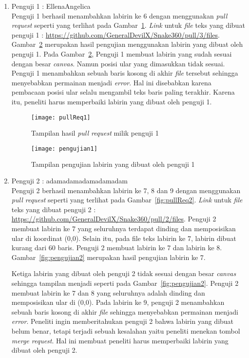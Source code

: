 \begin{enumerate}
	\item Penguji 1 : EllenaAngelica\\
	Penguji 1 berhasil menambahkan labirin ke 6 dengan menggunakan \textit{pull request} seperti yang terlihat pada Gambar~\ref{fig:pullReq1}. \textit{Link} untuk \textit{file} teks yang dibuat penguji 1 :  \url{https://github.com/GeneralDevilX/Snake360/pull/3/files}. Gambar~\ref{fig:pengujian1} merupakan hasil pengujian menggunakan labirin yang dibuat oleh penguji 1. Pada Gambar~\ref{fig:pengujian1}, Penguji 1 membuat labirin yang sudah sesuai dengan besar \textit{canvas}. Namun posisi ular yang dimasukkan tidak sesuai. Penguji 1 menambahkan sebuah baris kosong di akhir \textit{file} tersebut sehingga menyebabkan permainan menjadi \textit{error}. Hal ini disebabkan karena pembacaan posisi ular selalu mengambil teks baris paling terakhir. Karena itu, peneliti harus memperbaiki labirin yang dibuat oleh penguji 1.
	
	\begin{figure}[H]
		\centering  
		\texttt{[image: pullReq1]}  
		\caption[Tampilan hasil \textit{pull request} milik penguji 1]{Tampilan hasil \textit{pull request} milik penguji 1}
		\label{fig:pullReq1} 
	\end{figure}
	
	\begin{figure}[H]
		\centering  
		\texttt{[image: pengujian1]}  
		\caption[Tampilan pengujian labirin ke 6 yang dibuat oleh penguji 1]{Tampilan pengujian labirin yang dibuat oleh penguji 1}
		\label{fig:pengujian1} 
	\end{figure}	
	
	\item Penguji 2 : adamadamadamadamadam\\
	Penguji 2 berhasil menambahkan labirin ke 7, 8 dan 9 dengan menggunakan \textit{pull request} seperti yang terlihat pada Gambar~\ref{fig:pullReq2}. \textit{Link} untuk \textit{file} teks yang dibuat penguji 2 : \url{https://github.com/GeneralDevilX/Snake360/pull/2/files}. Penguji 2 membuat labirin ke 7 yang seluruhnya terdapat dinding dan memposisikan ular di koordinat (0,0). Selain itu, pada file teks labirin ke 7, labirin dibuat kurang dari 60 baris. Penguji 2 membuat labirin ke 7 dan labirin ke 8. Gambar~\ref{fig:pengujian2} merupakan hasil pengujian labirin ke 7.
	
	
	Ketiga labirin yang dibuat oleh penguji 2 tidak sesuai dengan besar \textit{canvas} sehingga tampilan menjadi seperti pada Gambar~\ref{fig:pengujian2}. Penguji 2 membuat labirin ke 7 dan 8 yang seluruhnya adalah dinding dan memposisikan ular di (0,0). Pada labirin ke 9, penguji 2 menambahkan sebuah baris kosong di akhir \textit{file} sehingga menyebabkan permainan menjadi \textit{error}. Peneliti ingin memberitahukan penguji 2 bahwa labirin yang dibuat belum benar, tetapi terjadi sebuah kesalahan yaitu peneliti menekan tombol \textit{merge request}. Hal ini membuat peneliti harus memperbaiki labirin yang dibuat oleh penguji 2.
	

\end{enumerate}
